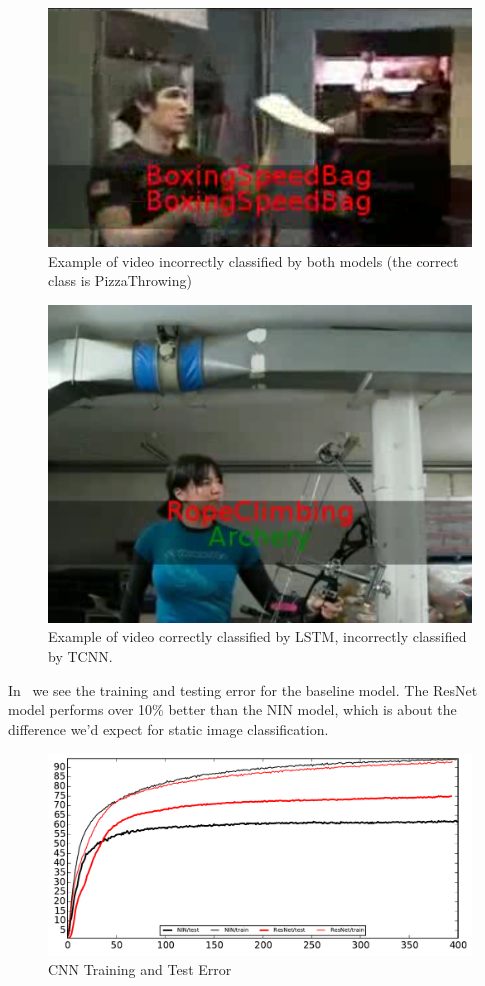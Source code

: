 \begin{figure}
  \centering
  \includegraphics[width=0.8\linewidth]{figs/demoincorrect}
  \caption{Example of video incorrectly classified by both models (the correct class is PizzaThrowing)}
  \label{fig:demoincorrect}
\end{figure}

\begin{figure}
  \centering
  \includegraphics[width=0.8\linewidth]{figs/demo}
  \caption{Example of video correctly classified by LSTM, incorrectly classified by TCNN. }
  \label{fig:demo}
\end{figure}


In~ we see the training and testing error for the baseline model. The ResNet model performs over 10\% better than the NIN model, which is about the difference we'd expect for static image classification. 
\begin{figure}
  \centering
  \includegraphics[width=1.0\linewidth]{figs/CNNout}
  \caption{CNN Training and Test Error}
  \label{fig:cnntest}
\end{figure}

